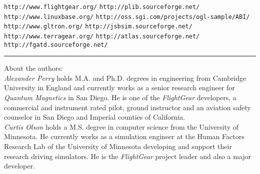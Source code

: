 \documentclass[a4paper,10pt]{article}
\begin{document}
%
\renewcommand{\refname}{\section*{References}}
\begin{footnotesize}
\begin{thebibliography}{99}
 \texttt{http://www.flightgear.org/}
 \texttt{http://plib.sourceforge.net/}
 \texttt{http://www.linuxbase.org/}
 \texttt{http://oss.sgi.com/projects/ogl-sample/ABI/}
 \texttt{http://www.gltron.org/}
 \texttt{http://jsbsim.sourceforge.net/}
 \texttt{http://www.terragear.org/}
 \texttt{http://atlas.sourceforge.net/}
 \texttt{http://fgatd.sourceforge.net/}
\end{thebibliography}
\end{footnotesize}
\hrule
%
%
%
{\footnotesize
About the authors:
\\[0.5mm]
\textsl{Alexander Perry} holds M.A. and Ph.D. degrees in engineering from
Cambridge University in England and currently works
as a senior research engineer for \textsl{Quantum Magnetics} in San Diego.
He is one of the \textsl{FlightGear} developers,
a commercial and instrument rated pilot, ground instructor and
an aviation safety counselor in San Diego and Imperial counties of California.
\\[0.5mm]
\textsl{Curtis Olson} holds a M.S. degree in computer science from
the University of Minnesota.  He currently works as a simulation
engineer at the Human Factors Research Lab of the University of
Minnesota developing and support their research driving simulators.
He is the \textsl{FlightGear} project leader and also a major developer.
}
%
%
\end{document}
